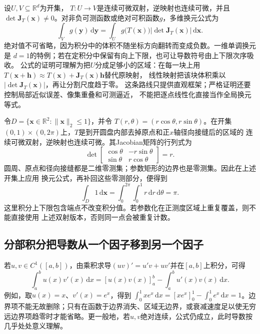 设$U,V\subseteq\mathbb{R}^d$为开集， $T:U\to V$是连续可微双射，逆映射也连续可微，并且 $\det\bm{J}_T(\bm{x})\neq0$。对非负可测函数或绝对可积函数$g$，多维换元公式为
\begin{equation}
  \int_V g(\bm{y})\,\mathrm{d}\bm{y}
  =
  \int_U
  g\bigl(T(\bm{x})\bigr)
  \left|\det\bm{J}_T(\bm{x})\right|
  \,\mathrm{d}\bm{x}.
\label{eq:analysis-multivariate-change-variables}
\end{equation}
绝对值不可省略，因为积分中的体积不随坐标方向翻转而变成负数。一维单调换元是 $d=1$的特例；若在定积分中保留有向上下限，也可让导数符号由上下限次序吸收。
公式的证明可理解为把$U$分成足够小的区域：在每一块上用
$T(\bm{x}+\bm{h})\approx T(\bm{x})+\bm{J}_T(\bm{x})\bm{h}$替代原映射，
线性映射把该块体积乘以$|\det\bm{J}_T(\bm{x})|$，再让分割尺度趋于零。
这条路线只提供直观框架；严格证明还要控制局部近似误差、像集重叠和可测逼近，
不能把逐点线性化直接当作全局换元等式。
\begin{example}[极坐标中的面积权重]
\label{ex:analysis-polar-coordinate-jacobian}
令$D=\{\bm{x}\in\mathbb{R}^2:\lVert\bm{x}\rVert_2\leq1\}$，并令
$T(r,\theta)=(r\cos\theta,r\sin\theta)$。在开集
$(0,1)\times(0,2\pi)$上，$T$是到开圆盘内部去掉原点和正$x$轴径向接缝后的区域的
连续可微双射，逆映射也连续可微。其Jacobian矩阵的行列式为
\[   \det
\begin{bmatrix}     \cos\theta & -r\sin\theta\\     \sin\theta & r\cos\theta
\end{bmatrix}   =r. \]
圆周、原点和径向接缝都是二维零测集；参数矩形的边界也是零测集。因此在上述开集上应用
换元公式，再补回这些零测部分，便得到
\[   \int_D1\,\mathrm{d}\bm{x}   =   \int_0^{2\pi}\int_0^1r\,\mathrm{d}r\,\mathrm{d}\theta   =\pi. \]
这里积分上下限包含端点不改变积分值。若参数化在正测度区域上重复覆盖，则不能直接使用
上述双射版本，否则同一点会被重复计数。
\end{example}
\subsection{分部积分把导数从一个因子移到另一个因子}

若$u,v\in C^1([a,b])$，由乘积求导$(uv)'=u'v+uv'$并在$[a,b]$上积分，可得
\begin{equation}
  \int_a^b u(x)v'(x)\,\mathrm{d}x
  =
  [u(x)v(x)]_a^b
  -
  \int_a^b u'(x)v(x)\,\mathrm{d}x.
\label{eq:analysis-integration-by-parts}
\end{equation}
例如，取$u(x)=x$、$v'(x)=e^x$，得到 $\int_0^1xe^x\,\mathrm{d}x=[xe^x]_0^1-\int_0^1e^x\,\mathrm{d}x=1$。边界项不能无故删除；只有在函数于边界消失、区域无边界，或衰减速度足以使无穷远边界项趋零时才能省略。更一般地，若$u,v$绝对连续，公式仍成立，此时导数按几乎处处意义理解。
